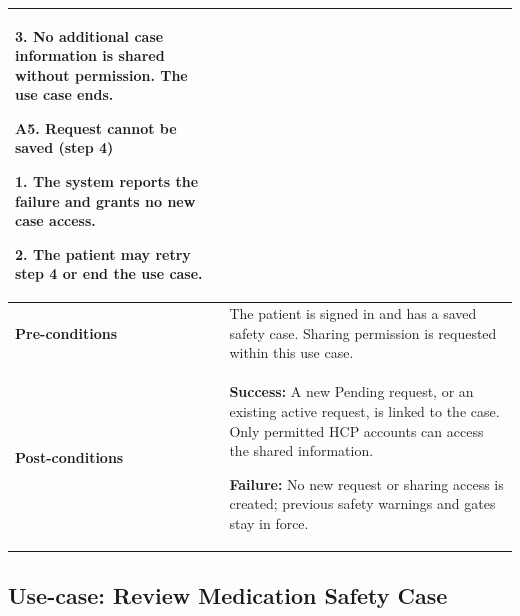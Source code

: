 \begin{longtable}{|p{}|p{}|}
3. No additional case information
is shared without permission.
The use case ends.
\par\smallskip
\textbf{A5. Request cannot be saved (step 4)}\par
1. The system reports the failure and grants no new case access.\par
2. The patient may retry step 4 or end the use case.
\\ \hline
\textbf{Pre-conditions} & The patient is signed in and has a saved safety case. Sharing permission is requested within this use case. \\ \hline
\textbf{Post-conditions} & \textbf{Success:} A new Pending request, or an existing active request, is linked to the case. Only permitted HCP accounts can access the shared information.\par
\textbf{Failure:} No new request or sharing access is created; previous safety warnings and gates stay in force. \\ \hline
\end{longtable}


\clearpage
\subsection{Use-case: Review Medication Safety Case}
\label{uc:uc-05}

